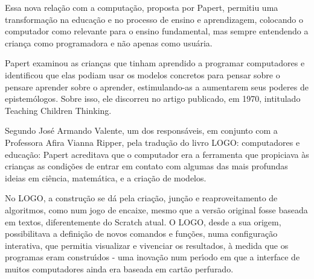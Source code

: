 \documentclass[
12pt,		%
openright,	%
twoside,  %
a4paper,			%
chapter=TITLE,		%
english,			%
french,				%
spanish,			%
brazil				%
]{USPSC-classe/USPSC}
\begin{document}
\noindent\begin{center}\mbox{\centering{}}\end{center}


Essa nova rela\c{c}\~ao com a computa\c{c}\~ao, proposta por Papert, permitiu uma transforma\c{c}\~ao na educa\c{c}\~ao e no processo de ensino e aprendizagem, colocando o computador como relevante para o ensino fundamental, mas sempre entendendo a crian\c{c}a como programadora e n\~ao apenas como usu\'aria.














Papert examinou as crian\c{c}as que tinham aprendido a programar computadores e identificou que elas podiam usar os modelos concretos para \textquotedbl pensar sobre o pensar\textquotedbl  e \textquotedbl aprender sobre o aprender\textquotedbl  [XXX], estimulando-as  a aumentarem seus poderes de epistem\'ologos. Sobre isso, ele discorreu no artigo publicado, em 1970, intitulado Teaching Children Thinking.














Segundo Jos\'e Armando Valente, um dos respons\'aveis, em conjunto com a Professora Afira Vianna Ripper, pela tradu\c{c}\~ao do livro LOGO: computadores e educa\c{c}\~ao: \textquotedbl Papert acreditava que o computador era a ferramenta que propiciava \`as crian\c{c}as as condi\c{c}\~oes de entrar em contato com algumas das mais profundas ideias em ci\^encia, matem\'atica, e a cria\c{c}\~ao de modelos\textquotedbl .














No LOGO, a constru\c{c}\~ao se d\'a pela cria\c{c}\~ao, jun\c{c}\~ao e reaproveitamento de algoritmos, como num jogo de encaixe, mesmo que a vers\~ao original fosse baseada em textos, diferentemente do Scratch atual. O LOGO, desde a sua origem, possibilitava a defini\c{c}\~ao de novos comandos e fun\c{c}\~oes, numa configura\c{c}\~ao interativa, que permitia visualizar e vivenciar os resultados, \`a medida que os programas eram constru\'{\i}dos  - uma inova\c{c}\~ao num per\'{\i}odo em que a interface de muitos computadores ainda era baseada em cart\~ao perfurado.
\end{document}
